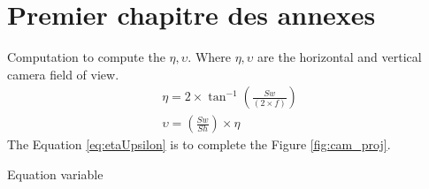 \documentclass[english]{spimubphdthesis}
\begin{document}
\chapter{Premier chapitre des annexes}

Computation to compute the $\eta, \upsilon$. Where $\eta, \upsilon$ are the horizontal and vertical camera field of view.
	\begin{equation} \label{eq:etaUpsilon}
 	 \begin{split}
		\eta = 2\times \tan^{-1} (\frac{Sw}{(2\times f)}  ) 
 	   \\
		\upsilon = (\frac{Sw}{Sh} )\times \eta
 	 \end{split}
	\end{equation}
	The Equation \ref{eq:etaUpsilon} is to complete the Figure \ref{fig:cam_proj}.
 


Equation variable 
\end{document}
